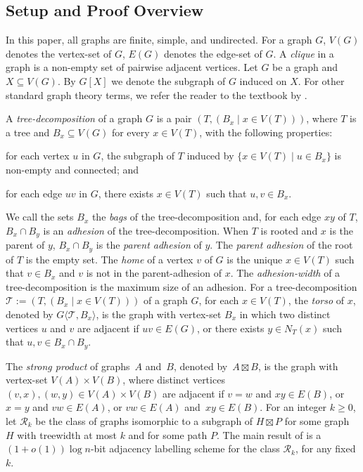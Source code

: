 \documentclass{patmorin}
\renewcommand{\geq}{\geqslant}
\newcommand{\defin}[1]{\emph{\textcolor{brightmaroon}{#1}}}
\newcommand{\torso}[2]{{#1}\langle{#2}\rangle}
\begin{document}
\subsection{Setup and Proof Overview}
\label{KeyTools}

In this paper, all graphs are finite, simple, and undirected.  For a graph $G$, \defin{$V(G)$} denotes the vertex-set of $G$, \defin{$E(G)$} denotes the edge-set of $G$.  A \defin{clique} in a graph is a non-empty set of pairwise adjacent vertices.   Let $G$ be a graph and $X\subseteq V(G)$. By $G[X]$ we denote the subgraph of $G$ induced on $X$. For other standard graph theory terms, we refer the reader to the textbook by \citet{diestel:graph}.

A \defin{tree-decomposition} of a graph $G$ is a pair $(T,(B_x \mid x \in V(T)))$, where $T$ is a tree and $B_x \subseteq V(G)$ for every $x \in V(T)$, with the following properties:
\begin{enumerate*}[label=(\alph*)]
  \item for each vertex $u$ in $G$, the subgraph of $T$ induced by $\{x \in V(T) \mid u \in B_x\}$ is non-empty and connected; and
  \item for each edge $uv$ in $G$, there exists $x\in V(T)$ such that $u,v\in B_x$.
\end{enumerate*}
We call the sets $B_x$ the \defin{bags} of the tree-decomposition and, for each edge $xy$ of $T$, $B_x\cap B_y$ is an \defin{adhesion} of the tree-decomposition.  When $T$ is rooted and $x$ is the parent of $y$, $B_x\cap B_y$ is the \defin{parent adhesion} of $y$. The \defin{parent adhesion} of the root of $T$ is the empty set. The \defin{home} of a vertex $v$ of $G$ is the unique $x\in V(T)$ such that $v\in B_x$ and $v$ is not in the parent-adhesion of $x$. The \defin{adhesion-width} of a tree-decomposition is the maximum size of an adhesion. For a tree-decomposition $\mathcal{T}:=(T,(B_x \mid x\in V(T)))$ of a graph $G$, for each  $x\in V(T)$, the \defin{torso} of $x$, denoted by \defin{$\torso{G}{\mathcal{T},B_x}$}, is the graph with vertex-set $B_x$ in which two distinct vertices $u$ and $v$ are adjacent if $uv \in E(G)$, or there exists $y \in N_T(x)$  such that $u,v \in B_x \cap B_y$.

The \defin{strong product} of graphs~$A$ and~$B$, denoted by~${A \boxtimes B}$, is the graph with vertex-set ${V(A) \times V(B)}$, where distinct vertices ${(v,x),(w,y) \in V(A) \times V(B)}$ are adjacent if
${v=w}$ and ${xy \in E(B)}$, or
${x=y}$ and ${vw \in E(A)}$, or
${vw \in E(A)}$ and~${xy \in E(B)}$.
For an integer $k\geq 0$, let \defin{$\mathcal{R}_{k}$} be the class of graphs isomorphic to a subgraph of $H\boxtimes P$ for some graph $H$ with treewidth at most $k$ and for some path $P$.  The main result of \citet{dujmovic.esperet.ea:adjacency} is a $(1+o(1))\log n$-bit adjacency labelling scheme for the class $\mathcal{R}_k$, for any fixed $k$.
\end{document}
